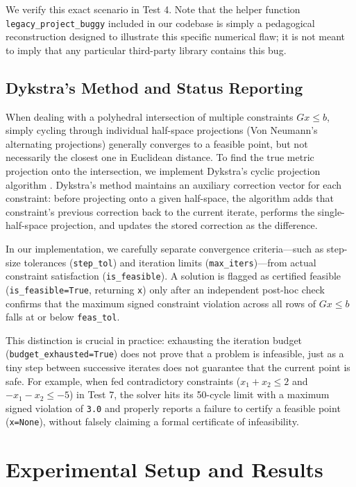\documentclass[11pt,a4paper]{article}
\begin{document}
We verify this exact scenario in Test 4. Note that the helper function \texttt{legacy\_project\_buggy} included in our codebase is simply a pedagogical reconstruction designed to illustrate this specific numerical flaw; it is not meant to imply that any particular third-party library contains this bug.

\subsection{Dykstra's Method and Status Reporting}
When dealing with a polyhedral intersection of multiple constraints $G x \le b$, simply cycling through individual half-space projections (Von Neumann's alternating projections) generally converges to a feasible point, but not necessarily the closest one in Euclidean distance. To find the true metric projection onto the intersection, we implement Dykstra's cyclic projection algorithm \cite{dykstra1983}. Dykstra's method maintains an auxiliary correction vector for each constraint: before projecting onto a given half-space, the algorithm adds that constraint's previous correction back to the current iterate, performs the single-half-space projection, and updates the stored correction as the difference.

In our implementation, we carefully separate convergence criteria---such as step-size tolerances (\texttt{step\_tol}) and iteration limits (\texttt{max\_iters})---from actual constraint satisfaction (\texttt{is\_feasible}). A solution is flagged as certified feasible (\texttt{is\_feasible=True}, returning \texttt{x}) only after an independent post-hoc check confirms that the maximum signed constraint violation across all rows of $G x \le b$ falls at or below \texttt{feas\_tol}.

This distinction is crucial in practice: exhausting the iteration budget (\texttt{budget\_exhausted=True}) does not prove that a problem is infeasible, just as a tiny step between successive iterates does not guarantee that the current point is safe. For example, when fed contradictory constraints ($x_1 + x_2 \le 2$ and $-x_1 - x_2 \le -5$) in Test 7, the solver hits its 50-cycle limit with a maximum signed violation of \texttt{3.0} and properly reports a failure to certify a feasible point (\texttt{x=None}), without falsely claiming a formal certificate of infeasibility.

\section{Experimental Setup and Results}
\end{document}
